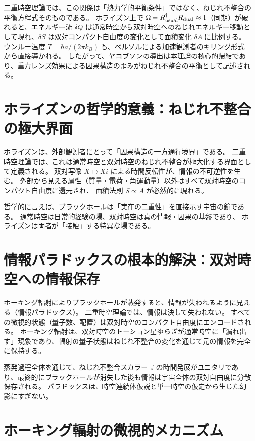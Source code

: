 \documentclass[dvipdfmx,a4paper]{jsbook}
\theoremstyle{definition}
\theoremstyle{remark}
\begin{document}
二重時空理論では、この関係は「熱力学的平衡条件」ではなく、ねじれ不整合の平衡方程式そのものである。
ホライズン上で $\Omega = R_{\rm usual}^\dagger R_{\rm dual} \approx 1$（同期）が破れると、エネルギー流 $\delta Q$ は通常時空から双対時空へのねじれエネルギー移動として現れ、$\delta S$ は双対コンパクト自由度の変化として面積変化 $\delta A$ に比例する。
ウンルー温度 $T = \hbar a / (2\pi k_B)$ も、ベルソルによる加速観測者のキリング形式から直接導かれる。
したがって、ヤコブソンの導出は本理論の核心的帰結であり、重力レンズ効果による因果構造の歪みがねじれ不整合の平衡として記述される。

\section{ホライズンの哲学的意義：ねじれ不整合の極大界面}

ホライズンは、外部観測者にとって「因果構造の一方通行境界」である。
二重時空理論では、これは通常時空と双対時空のねじれ不整合が極大化する界面として定義される。
双対写像 $X \mapsto Xi$ による時間反転性が、情報の不可逆性を生む。
外部から見える属性（質量・電荷・角運動量）以外はすべて双対時空のコンパクト自由度に還元され、
面積法則 $S \propto A$ が必然的に現れる。

哲学的に言えば、ブラックホールは「実在の二重性」を直接示す宇宙の鏡である。
通常時空は日常的経験の場、双対時空は真の情報・因果の基盤であり、
ホライズンは両者が「接触」する特異な場である。

\section{情報パラドックスの根本的解決：双対時空への情報保存}

ホーキング輻射によりブラックホールが蒸発すると、情報が失われるように見える（情報パラドックス）。
二重時空理論では、情報は決して失われない。
すべての微視的状態（量子数、配置）は双対時空のコンパクト自由度にエンコードされる。
ホーキング輻射は、双対時空のトーション星ゆらぎが通常時空に「漏れ出す」現象であり、輻射の量子状態はねじれ不整合の変化を通じて元の情報を完全に保持する。

蒸発過程全体を通じて、ねじれ不整合スカラー $J$ の時間発展がユニタリであり、最終的にブラックホールが消失した後も情報は宇宙全体の双対自由度に分散保存される。
パラドックスは、時空連続体仮説と単一時空の仮定から生じた幻影にすぎない。

\section{ホーキング輻射の微視的メカニズム}
\end{document}
